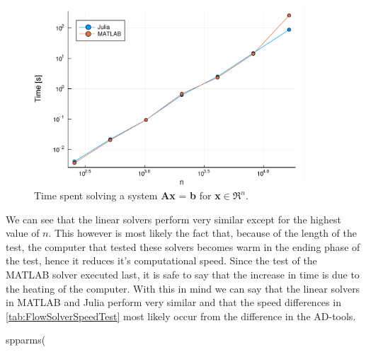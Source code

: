 \begin{figure}[htbp]
    \centering
    \includegraphics[width = 0.9\textwidth]{figures/benchmark_linear_solvers.pdf}
    \caption{Time spent solving a system \textbf{Ax} = \textbf{b} for \textbf{x}$\in\Re^{n}$.}
    \label{fig:benchmarkLinearSolver}
\end{figure}
We can see that the linear solvers perform very similar except for the highest value of $n$. This however is most likely the fact that, because of the length of the test, the computer that tested these solvers becomes warm in the ending phase of the test, hence it reduces it's computational speed. Since the test of the MATLAB solver executed last, it is safe to say that the increase in time is due to the heating of the computer. With this in mind we can say that the linear solvers in MATLAB and Julia perform very similar and that the speed differences in \autoref{tab:FlowSolverSpeedTest} most likely occur from the difference in the AD-tools.


spparms(